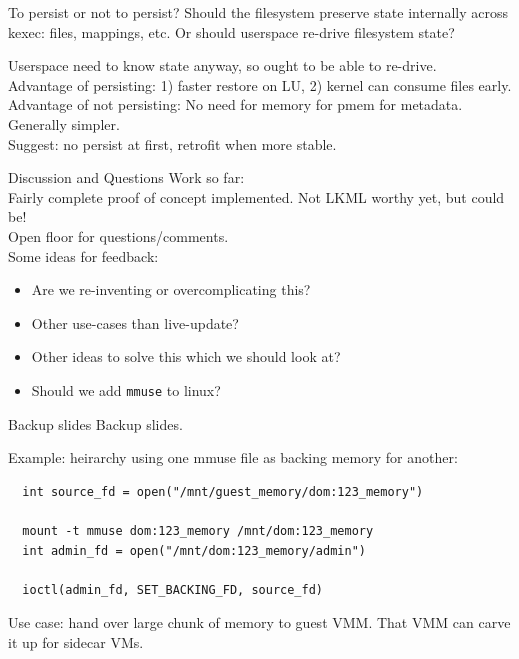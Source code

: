 \documentclass{beamer}
\begin{document}
\begin{frame}{To persist or not to persist?}
  Should the filesystem preserve state internally across kexec: files, mappings, etc.
  Or should userspace re-drive filesystem state?

  Userspace need to know state anyway, so ought to be able to re-drive.\\

  Advantage of persisting: 1) faster restore on LU, 2) kernel can consume files early.\\

  Advantage of not persisting: No need for memory for pmem for metadata. Generally simpler.\\

  Suggest: no persist at first, retrofit when more stable.
\end{frame}

\begin{frame}{Discussion and Questions}
  Work so far:\\
  Fairly complete proof of concept implemented. Not LKML worthy yet, but could be!\\

  Open floor for questions/comments.\\

  Some ideas for feedback:
  \begin{itemize}
    \item Are we re-inventing or overcomplicating this?
    \item Other use-cases than live-update?
    \item Other ideas to solve this which we should look at?
    \item Should we add \texttt{mmuse} to linux?
  \end{itemize}
\end{frame}

\begin{frame}{Backup slides}
  Backup slides.
\end{frame}

\begin{frame}[fragile]
  Example: heirarchy using one mmuse file as backing memory for another:\\

  \begin{verbatim}
  int source_fd = open("/mnt/guest_memory/dom:123_memory")

  mount -t mmuse dom:123_memory /mnt/dom:123_memory
  int admin_fd = open("/mnt/dom:123_memory/admin")

  ioctl(admin_fd, SET_BACKING_FD, source_fd)
  \end{verbatim}
  \vspace{0.7cm}
  Use case: hand over large chunk of memory to guest VMM. That VMM can carve it up for sidecar VMs.
\end{frame}
\end{document}
